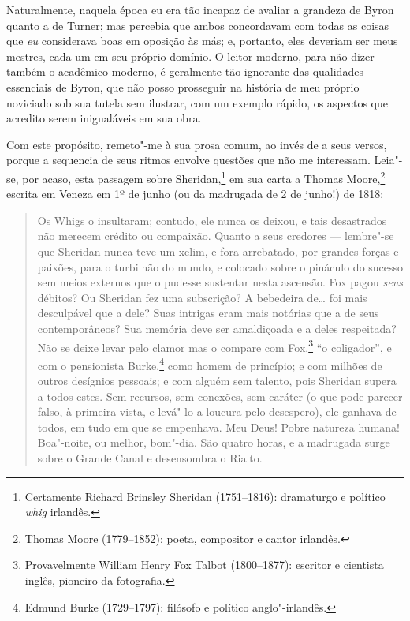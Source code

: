 Naturalmente, naquela época eu era tão incapaz de avaliar a
grandeza de Byron quanto a de Turner; mas percebia que ambos concordavam
com todas as coisas que \textit{eu} considerava boas em oposição às más;
e, portanto, eles deveriam ser meus mestres, cada um em seu próprio
domínio. O leitor moderno, para não dizer também o acadêmico moderno, é
geralmente tão ignorante das qualidades essenciais de Byron, que não
posso prosseguir na história de meu próprio noviciado sob sua tutela sem
ilustrar, com um exemplo rápido, os aspectos que acredito serem
inigualáveis em sua obra.

Com este propósito, remeto"-me à sua prosa comum, ao invés de a seus
versos, porque a sequencia de seus ritmos envolve questões que não me
interessam. Leia"-se, por acaso, esta passagem sobre Sheridan,\footnote{Certamente
  Richard Brinsley Sheridan (1751--1816): dramaturgo e político
  \textit{whig} irlandês.} em sua carta a Thomas
Moore,\footnote{Thomas Moore (1779--1852): poeta, compositor e cantor
  irlandês.} escrita em Veneza em 1º de junho (ou da
madrugada de 2 de junho!) de 1818: %

\begin{quote}
Os Whigs o insultaram; contudo, ele nunca os deixou, e tais
desastrados não merecem crédito ou compaixão. Quanto a seus credores ---
lembre"-se que Sheridan nunca teve um xelim, e fora arrebatado, por
grandes forças e paixões, para o turbilhão do mundo, e colocado sobre o
pináculo do sucesso sem meios externos que o pudesse sustentar nesta
ascensão. Fox pagou \textit{seus} débitos? Ou Sheridan fez uma subscrição?
A bebedeira de\ldots{} foi mais desculpável que a dele? Suas intrigas eram
mais notórias que a de seus contemporâneos? Sua memória deve ser
amaldiçoada e a deles respeitada? Não se deixe levar pelo clamor mas o
compare com Fox,\footnote{Provavelmente William Henry Fox Talbot
  (1800--1877): escritor e cientista inglês, pioneiro da fotografia.} ``o coligador'', e com o pensionista Burke,\footnote{Edmund
  Burke (1729--1797): filósofo e político anglo"-irlandês.}
como homem de princípio; e com milhões de outros desígnios pessoais; e
com alguém sem talento, pois Sheridan supera a todos estes. Sem
recursos, sem conexões, sem caráter (o que pode parecer falso, à
primeira vista, e levá"-lo a loucura pelo desespero), ele ganhava de
todos, em tudo em que se empenhava. Meu Deus! Pobre natureza humana!
Boa"-noite, ou melhor, bom"-dia. São quatro horas, e a madrugada surge
sobre o Grande Canal e desensombra o Rialto.
\end{quote}

